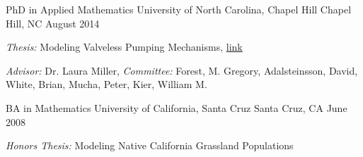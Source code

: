 
\begin{cventries}
  \cventry
    {PhD in Applied Mathematics} %
    {University of North Carolina, Chapel Hill} %
    {Chapel Hill, NC} %
    {August 2014} %
    {
    \begin{cvitems}
     \item{\textit{Thesis:} Modeling Valveless Pumping Mechanisms, \href{https://cdr.lib.unc.edu/concern/dissertations/rb68xc402}{link}}
     \item{\textit{Advisor:} Dr. Laura Miller, \textit{Committee:} Forest, M. Gregory, Adalsteinsson, David, White, Brian, Mucha, Peter, Kier, William M.}
     \end{cvitems}
    }

  \cventry
    {BA in Mathematics} %
    {University of California, Santa Cruz} %
    {Santa Cruz, CA} %
    {June 2008} %
    {
    \begin{cvitems}
     \item{\textit{Honors Thesis:} Modeling Native California Grassland Populations}
     \end{cvitems}
    }
    
\end{cventries}
